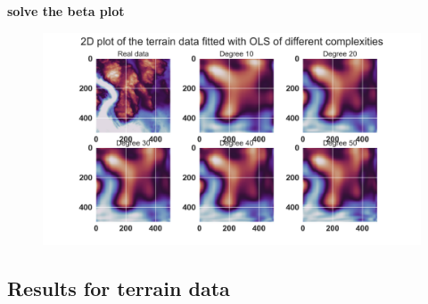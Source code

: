 \textbf{solve the beta plot}

\begin{figure}[h]
	\centering
	\includegraphics[width=\textwidth]{Figure_5.png}
	\caption{}
	\label{OLS figure terrain data}
\end{figure}
\subsection{Results for terrain data}
